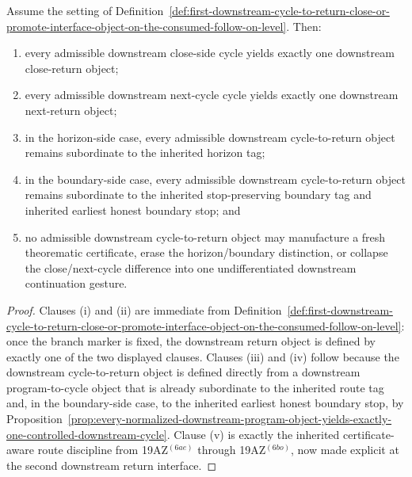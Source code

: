 \begin{proposition}
\label{prop:every-consumed-downstream-cycle-yields-exactly-one-honest-downstream-return-close-or-promote-object}
Assume the setting of Definition~\ref{def:first-downstream-cycle-to-return-close-or-promote-interface-object-on-the-consumed-follow-on-level}. Then:
\begin{enumerate}[label=(\roman*)]
 \item every admissible downstream close-side cycle yields exactly one downstream close-return object;
 \item every admissible downstream next-cycle cycle yields exactly one downstream next-return object;
 \item in the horizon-side case, every admissible downstream cycle-to-return object remains subordinate to the inherited horizon tag;
 \item in the boundary-side case, every admissible downstream cycle-to-return object remains subordinate to the inherited stop-preserving boundary tag and inherited earliest honest boundary stop; and
 \item no admissible downstream cycle-to-return object may manufacture a fresh theorematic certificate, erase the horizon/boundary distinction, or collapse the close/next-cycle difference into one undifferentiated downstream continuation gesture.
\end{enumerate}
\end{proposition}

\begin{proof}
Clauses (i) and (ii) are immediate from Definition~\ref{def:first-downstream-cycle-to-return-close-or-promote-interface-object-on-the-consumed-follow-on-level}: once the branch marker is fixed, the downstream return object is defined by exactly one of the two displayed clauses. Clauses (iii) and (iv) follow because the downstream cycle-to-return object is defined directly from a downstream program-to-cycle object that is already subordinate to the inherited route tag and, in the boundary-side case, to the inherited earliest honest boundary stop, by Proposition~\ref{prop:every-normalized-downstream-program-object-yields-exactly-one-controlled-downstream-cycle}. Clause (v) is exactly the inherited certificate-aware route discipline from 19AZ$^{(6ae)}$ through 19AZ$^{(6bo)}$, now made explicit at the second downstream return interface.
\end{proof}

